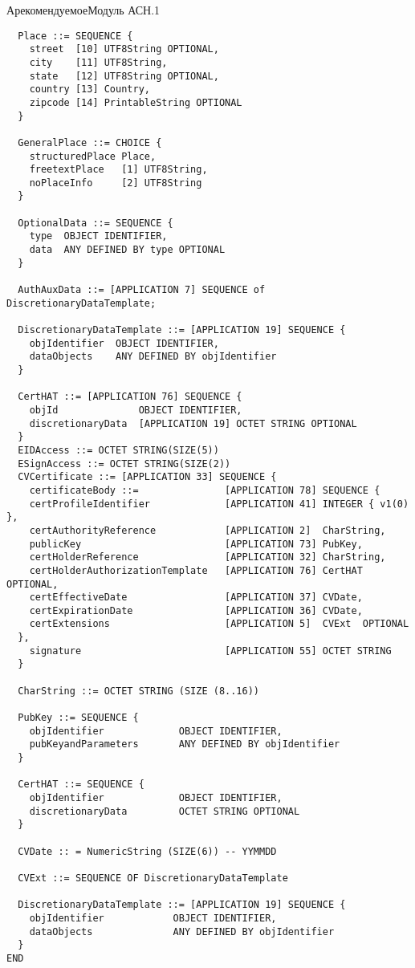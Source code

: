 \begin{appendix}{А}{рекомендуемое}{Модуль АСН.1}
\begin{verbatim}
  Place ::= SEQUENCE {
    street  [10] UTF8String OPTIONAL,
    city    [11] UTF8String,
    state   [12] UTF8String OPTIONAL,
    country [13] Country,
    zipcode [14] PrintableString OPTIONAL
  }
  
  GeneralPlace ::= CHOICE {
    structuredPlace Place,
    freetextPlace   [1] UTF8String,
    noPlaceInfo     [2] UTF8String
  }
  
  OptionalData ::= SEQUENCE {
    type  OBJECT IDENTIFIER,
    data  ANY DEFINED BY type OPTIONAL
  }

  AuthAuxData ::= [APPLICATION 7] SEQUENCE of DiscretionaryDataTemplate;

  DiscretionaryDataTemplate ::= [APPLICATION 19] SEQUENCE {
    objIdentifier  OBJECT IDENTIFIER,
    dataObjects    ANY DEFINED BY objIdentifier
  }

  CertHAT ::= [APPLICATION 76] SEQUENCE {
    objId              OBJECT IDENTIFIER,
    discretionaryData  [APPLICATION 19] OCTET STRING OPTIONAL
  }
  EIDAccess ::= OCTET STRING(SIZE(5))
  ESignAccess ::= OCTET STRING(SIZE(2))
  CVCertificate ::= [APPLICATION 33] SEQUENCE {
    certificateBody ::=               [APPLICATION 78] SEQUENCE {
    certProfileIdentifier             [APPLICATION 41] INTEGER { v1(0) },
    certAuthorityReference            [APPLICATION 2]  CharString,
    publicKey                         [APPLICATION 73] PubKey,
    certHolderReference               [APPLICATION 32] CharString,
    certHolderAuthorizationTemplate   [APPLICATION 76] CertHAT  OPTIONAL,
    certEffectiveDate                 [APPLICATION 37] CVDate,
    certExpirationDate                [APPLICATION 36] CVDate,
    certExtensions                    [APPLICATION 5]  CVExt  OPTIONAL
  },
    signature                         [APPLICATION 55] OCTET STRING
  }

  CharString ::= OCTET STRING (SIZE (8..16))

  PubKey ::= SEQUENCE {
    objIdentifier             OBJECT IDENTIFIER,
    pubKeyandParameters       ANY DEFINED BY objIdentifier 
  }

  CertHAT ::= SEQUENCE {
    objIdentifier             OBJECT IDENTIFIER,
    discretionaryData         OCTET STRING OPTIONAL
  }

  CVDate :: = NumericString (SIZE(6)) -- YYMMDD

  CVExt ::= SEQUENCE OF DiscretionaryDataTemplate

  DiscretionaryDataTemplate ::= [APPLICATION 19] SEQUENCE {
    objIdentifier            OBJECT IDENTIFIER,
    dataObjects              ANY DEFINED BY objIdentifier
  }
END
\end{verbatim}

\end{appendix}
